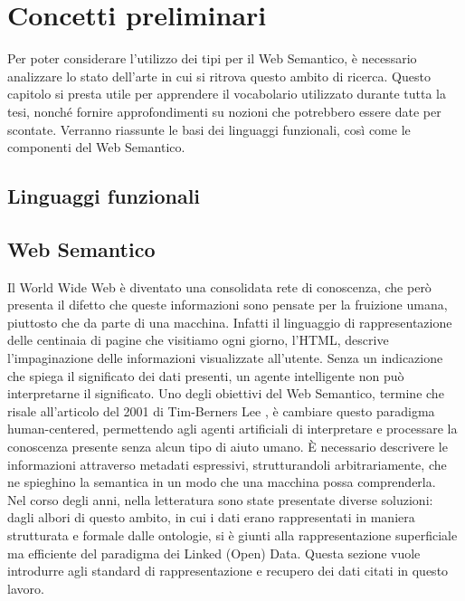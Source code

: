 \chapter[Concetti preliminari]{Concetti preliminari}\label{chap:preliminaries}
Per poter considerare l'utilizzo dei tipi per il Web Semantico, è necessario analizzare lo stato dell'arte in cui si ritrova questo ambito di ricerca.
Questo capitolo si presta utile per apprendere il vocabolario utilizzato durante tutta la tesi, nonché fornire approfondimenti su nozioni che potrebbero essere date per scontate.
Verranno riassunte le basi dei linguaggi funzionali, così come le componenti del Web Semantico.
\section[Linguaggi funzionali]{Linguaggi funzionali}

\section[Web Semantico]{Web Semantico}
Il World Wide Web è diventato una consolidata rete di conoscenza, che però presenta il difetto che queste informazioni sono pensate per la fruizione umana, piuttosto che da parte di una macchina. Infatti il linguaggio di rappresentazione delle centinaia di pagine che visitiamo ogni giorno, l’HTML, descrive l’impaginazione delle informazioni visualizzate all’utente. Senza un indicazione che spiega il significato dei dati presenti, un agente intelligente non può interpretarne il significato. Uno degli obiettivi del Web Semantico, termine che risale all'articolo del 2001 di Tim-Berners Lee \cite{berners2001semantic}, è cambiare questo paradigma human-centered, permettendo agli agenti artificiali di interpretare e processare la conoscenza presente senza alcun tipo di aiuto umano. È necessario descrivere le informazioni attraverso metadati espressivi, strutturandoli arbitrariamente, che ne spieghino la semantica in un modo che una macchina possa comprenderla.\\
Nel corso degli anni, nella letteratura sono state presentate diverse soluzioni: dagli albori di questo ambito, in cui i dati erano rappresentati in maniera strutturata e formale dalle ontologie, si è giunti alla rappresentazione superficiale ma efficiente del paradigma dei Linked (Open) Data. Questa sezione vuole introdurre agli standard di rappresentazione e recupero dei dati citati in questo lavoro.



